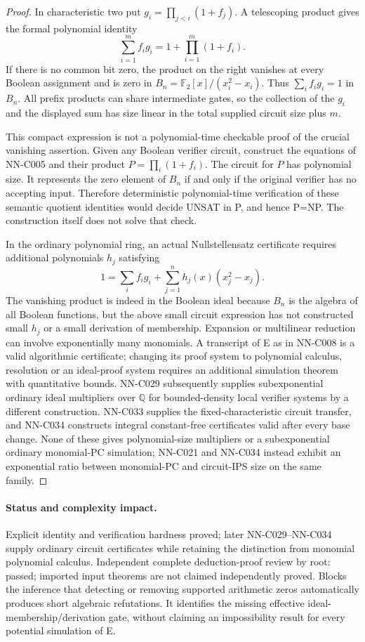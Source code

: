 \begin{proof}
In characteristic two put $g_i=\prod_{j<i}(1+f_j)$. A telescoping product gives the formal polynomial identity
\[
 \sum_{i=1}^m f_i g_i=1+\prod_{i=1}^m(1+f_i).
\]
If there is no common bit zero, the product on the right vanishes at every Boolean assignment and is zero in $B_n=\mathbb F_2[x]/(x_i^2-x_i)$. Thus $\sum_i f_i g_i=1$ in $B_n$. All prefix products can share intermediate gates, so the collection of the $g_i$ and the displayed sum has size linear in the total supplied circuit size plus $m$.

This compact expression is not a polynomial-time checkable proof of the crucial vanishing assertion. Given any Boolean verifier circuit, construct the equations of NN-C005 and their product $P=\prod_i(1+f_i)$. The circuit for $P$ has polynomial size. It represents the zero element of $B_n$ if and only if the original verifier has no accepting input. Therefore deterministic polynomial-time verification of these semantic quotient identities would decide UNSAT in P, and hence P=NP. The construction itself does not solve that check.

In the ordinary polynomial ring, an actual Nullstellensatz certificate requires additional polynomials $h_j$ satisfying
\[
 1=\sum_i f_i g_i+\sum_{j=1}^n h_j(x)(x_j^2-x_j).
\]
The vanishing product is indeed in the Boolean ideal because $B_n$ is the algebra of all Boolean functions, but the above small circuit expression has not constructed small $h_j$ or a small derivation of membership. Expansion or multilinear reduction can involve exponentially many monomials. A transcript of E as in NN-C008 is a valid algorithmic certificate; changing its proof system to polynomial calculus, resolution or an ideal-proof system requires an additional simulation theorem with quantitative bounds. NN-C029 subsequently supplies subexponential ordinary ideal multipliers over $\mathbb Q$ for bounded-density local verifier systems by a different construction. NN-C033 supplies the fixed-characteristic circuit transfer, and NN-C034 constructs integral constant-free certificates valid after every base change. None of these gives polynomial-size multipliers or a subexponential ordinary monomial-PC simulation; NN-C021 and NN-C034 instead exhibit an exponential ratio between monomial-PC and circuit-IPS size on the same family.
\end{proof}
\paragraph{Status and complexity impact.}
Explicit identity and verification hardness proved; later NN-C029--NN-C034 supply ordinary circuit certificates while retaining the distinction from monomial polynomial calculus. Independent complete deduction-proof review by root: passed; imported input theorems are not claimed independently proved. Blocks the inference that detecting or removing supported arithmetic zeros automatically produces short algebraic refutations. It identifies the missing effective ideal-membership/derivation gate, without claiming an impossibility result for every potential simulation of E.

